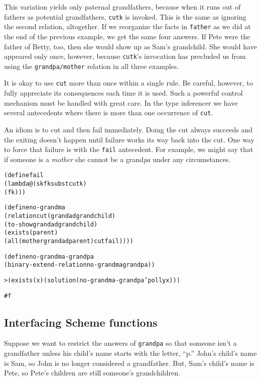 \noindent This variation yields only paternal grandfathers, because
when it runs out of fathers as potential grandfathers, \texttt{cutk}
is invoked.  This is the same as ignoring the second relation,
altogether.  If we reorganize the facts in \texttt{father} as we did
at the end of the previous example, we get the same four answers.  If
Pete were the father of Betty, too, then she would show up as Sam's
grandchild.  She would have appeared only once, however, because
\texttt{cutk}'s invocation has precluded us from using the
\texttt{grandpa/mother} relation in all three examples.

It is okay to use \texttt{cut} more than once within a single rule.
Be careful, however, to fully appreciate its consequences each time it
is used.  Such a powerful control mechanism must be handled with great
care.  In the type inferencer we have several antecedents where there
is more than one occurrence of \texttt{cut}.

An idiom is to cut and then fail immediately.  Doing the cut always
succeeds and the exiting doesn't happen until failure works its way
back into the cut.  One way to force that failure is with the
\texttt{fail} antecedent.  For example, we might say that if someone is a
\emph{mother} she cannot be a grand\emph{pa} under any circumstances.

\begin{alltt}
(define fail
  (lambda@ (sk fk subst cutk)
    (fk)))
\end{alltt}

\begin{alltt}
(define no-grandma
  (relation cut (grandad grandchild)
    (to-show grandad grandchild)
    (exists (parent)
      (all (mother grandad parent) cut fail))))

(define no-grandma-grandpa
  (binary-extend-relation no-grandma grandpa))

> (exists (x) (solution (no-grandma-grandpa 'polly x)))

#f
\end{alltt}        

\subsection{Interfacing Scheme functions}

Suppose we want to restrict the answers of \texttt{grandpa} so that
someone isn't a grandfather unless his child's name starts with the
letter, ``p.''  John's child's name is Sam, so John is no
longer considered a grandfather. But, Sam's child's name is
Pete, so Pete's children are still someone's grandchildren.

